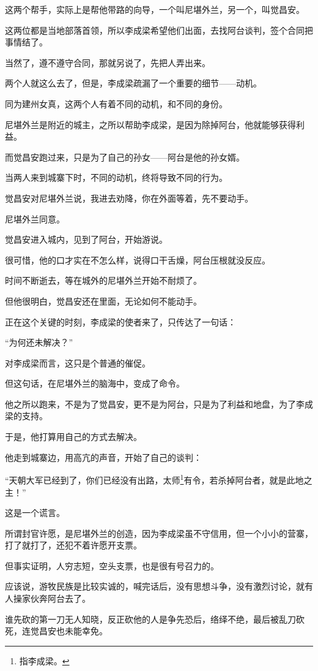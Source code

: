 \begin{multicols}{\theparacolNo}
		这两个帮手，实际上是帮他带路的向导，一个叫尼堪外兰，另一个，叫觉昌安。

		这两位都是当地部落首领，所以李成梁希望他们出面，去找阿台谈判，签个合同把事情结了。

		当然了，遵不遵守合同，那就另说了，先把人弄出来。

		两个人就这么去了，但是，李成梁疏漏了一个重要的细节——动机。

		同为建州女真，这两个人有着不同的动机，和不同的身份。

		尼堪外兰是附近的城主，之所以帮助李成梁，是因为除掉阿台，他就能够获得利益。

		而觉昌安跑过来，只是为了自己的孙女——阿台是他的孙女婿。

		当两人来到城寨下时，不同的动机，终将导致不同的行为。

		觉昌安对尼堪外兰说，我进去劝降，你在外面等着，先不要动手。

		尼堪外兰同意。

		觉昌安进入城内，见到了阿台，开始游说。

		很可惜，他的口才实在不怎么样，说得口干舌燥，阿台压根就没反应。

		时间不断逝去，等在城外的尼堪外兰开始不耐烦了。

		但他很明白，觉昌安还在里面，无论如何不能动手。

		正在这个关键的时刻，李成梁的使者来了，只传达了一句话：

		“为何还未解决？”

		对李成梁而言，这只是个普通的催促。

		但这句话，在尼堪外兰的脑海中，变成了命令。

		他之所以跑来，不是为了觉昌安，更不是为阿台，只是为了利益和地盘，为了李成梁的支持。

		于是，他打算用自己的方式去解决。

		他走到城寨边，用高亢的声音，开始了自己的谈判：

		“天朝大军已经到了，你们已经没有出路，太师\footnote{指李成梁。}有令，若杀掉阿台者，就是此地之主！”

		这是一个谎言。

		所谓封官许愿，是尼堪外兰的创造，因为李成梁虽不守信用，但一个小小的营寨，打了就打了，还犯不着许愿开支票。

		但事实证明，人穷志短，空头支票，也是很有号召力的。

		应该说，游牧民族是比较实诚的，喊完话后，没有思想斗争，没有激烈讨论，就有人操家伙奔阿台去了。

		谁先砍的第一刀无人知晓，反正砍他的人是争先恐后，络绎不绝，最后被乱刀砍死，连觉昌安也未能幸免。


\end{multicols}
